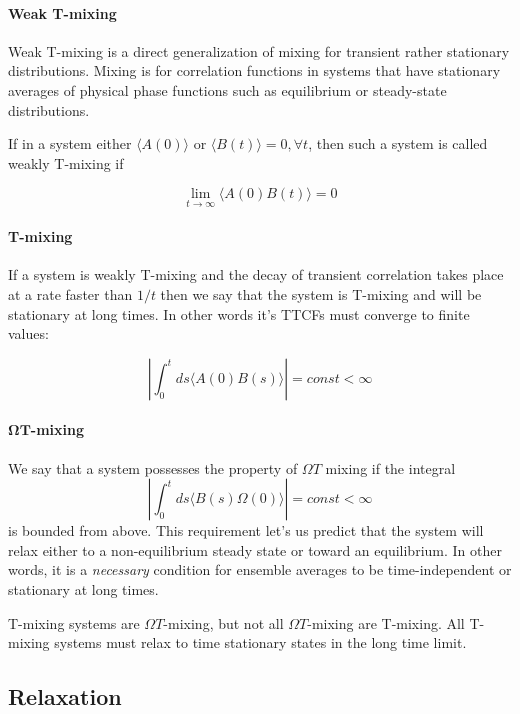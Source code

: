 \documentclass[a4paper,12pt]{article}
\begin{document}
\paragraph{Weak T-mixing}

Weak T-mixing is a direct generalization of mixing for transient rather stationary distributions. Mixing is for correlation functions in systems that have stationary averages of physical phase functions such as equilibrium or steady-state distributions.

If in a system either $\langle A(0) \rangle $ or $ \langle B(t) \rangle = 0, \forall t $, then such a system is called weakly T-mixing if

\begin{equation}
  \lim_{t \to \infty} \langle A(0) B(t) \rangle = 0
\end{equation}

\paragraph{T-mixing}
If a system is weakly T-mixing and the decay of transient correlation takes place at a rate faster than $1/t$ then we say that the system is T-mixing and will be stationary at long times. In other words it's TTCFs must converge to finite values:

\begin{equation}
  \left| \int_0^t ds \langle A(0) B(s) \rangle \right| = const < \infty 
\end{equation}


\paragraph{$\bm{\Omega T}$-mixing}
We say that a system possesses the property of $\Omega T$ mixing if the integral
\begin{equation}
    \left| \int_0^t ds \langle B(s) \Omega(0) \rangle \right| = const < \infty
\end{equation}
is bounded from above. This requirement let's us predict that the system will relax either to a non-equilibrium steady state or toward an equilibrium. In other words, it is a \textit{necessary} condition for ensemble averages to be time-independent or stationary at long times.

T-mixing systems are $\Omega T$-mixing, but not all $\Omega T$-mixing are T-mixing. All T-mixing systems must relax to time stationary states in the long time limit.


\subsection{Relaxation}
\end{document}
